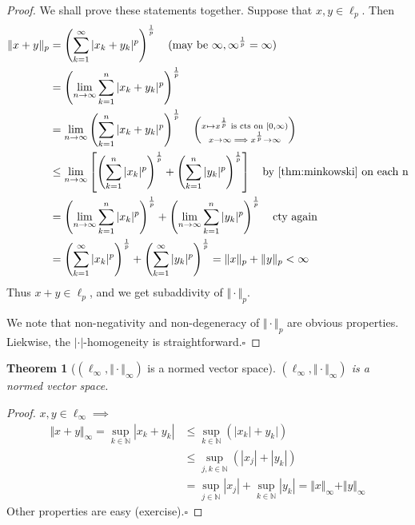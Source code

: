 \documentclass[11pt, oneside]{book}
\theoremstyle{break}
\newtheorem{thm}{Theorem}[section]
\newtheorem*{proof}{Proof}
\newcommand{\bb}[1]{\mathbb{#1}}			%
\newcommand{\qed}{\hfill\ensuremath{\square}}	%
\begin{document}
\begin{proof}
	We shall prove these statements together. Suppose that $x, y \in \ell_p$. Then
	\begin{align*}
		\Vert x + y\Vert _p &= \left( \sum_{k=1}^{\infty} |x_k + y_k|^p \right)^{\frac{1}{p}} \quad \text{(may be $\infty, \infty^{\frac{1}{p}} = \infty$)} \\
				&= \left( \lim_{n \to \infty} \sum_{k=1}^{n} |x_k + y_k|^p \right)^{\frac{1}{p}} \\
				&= \lim_{n \to \infty} \left( \sum_{k=1}^{n} |x_k + y_k|^p \right)^{\frac{1}{p}} \quad \left(\substack{x \mapsto x^{\frac{1}{p}} \text{ is cts on } [0, \infty) \\ x \to \infty \implies x^{\frac{1}{p}} \to \infty} \right) \\
				&\leq \lim_{n \to \infty} \left[ \left( \sum_{k=1}^{n} |x_k|^p \right)^{\frac{1}{p}} + \left( \sum_{k=1}^{n} |y_k|^p \right)^{\frac{1}{p}} \right] \quad \text{by \autoref{thm:minkowski} on each n} \\
				&= \left( \lim_{n \to \infty} \sum_{k=1}^{n} |x_k|^p \right)^{\frac{1}{p}} + \left( \lim_{n \to \infty} \sum_{k=1}^{n} |y_k|^p \right)^{\frac{1}{p}} \quad \text{cty again} \\
				&= \left( \sum_{k=1}^{\infty} |x_k|^p \right)^{\frac{1}{p}} + \left( \sum_{k=1}^{\infty} |y_k|^p \right)^{\frac{1}{p}} = \Vert x\Vert _p + \Vert y\Vert _p < \infty
	\end{align*}
	 Thus $x + y \in \ell_p$, and we get subaddivity of $\Vert \cdot\Vert _p$.

	 We note that non-negativity and non-degeneracy of $\Vert \cdot\Vert _p$ are obvious properties. Liekwise, the $|\cdot|$-homogeneity is straightforward.\qed
\end{proof}

\begin{thm}[$(\ell_\infty, \Vert \cdot\Vert _\infty)$ is a normed vector space]
	$(\ell_\infty, \Vert \cdot\Vert _\infty)$ is a normed vector space.
\end{thm}

\begin{proof}
	$x, y \in \ell_\infty \implies$
	\begin{align*}
		\Vert x + y\Vert _\infty = \sup_{k \in \bb{N}} |x_k + y_k| &\leq \sup_{k \in \bb{N}} (|x_k| + y_k|) \\
				&\leq \sup_{j, k \in \bb{N}} (|x_j| + |y_k|) \\
				&= \sup_{j \in \bb{N}} |x_j| + \sup_{k \in \bb{N}} |y_k| = \Vert x\Vert _\infty + \Vert y\Vert _\infty
	\end{align*}
	Other properties are easy (exercise).\qed
\end{proof}
\end{document}
